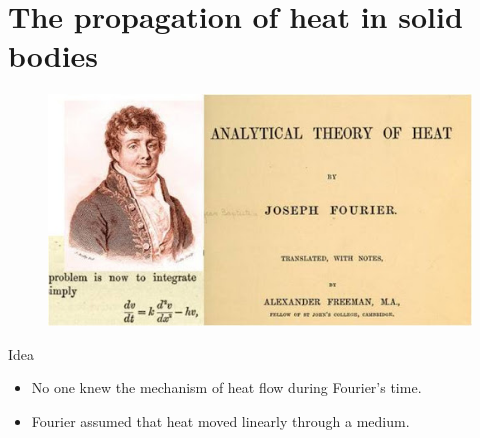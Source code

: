 \documentclass[aspectratio=169]{beamer}
\begin{document}
\section{The propagation of heat in solid bodies}

\begin{frame}{}
\vfill
\begin{figure}[H]
    \centering
    \includegraphics[width=.8\textwidth]{figures/theory_of_heat.jpg}
\end{figure}
\vfill
\end{frame}

\begin{frame}{Idea}
\vfill
    \begin{itemize}
        \pause
        \item No one knew the mechanism of heat flow during Fourier's time.
        \pause
        \item Fourier assumed that heat moved linearly through a medium.
    \end{itemize}
\vfill
\end{frame}
\end{document}

